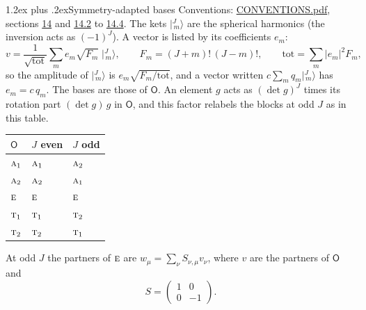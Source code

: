 \documentclass[10pt,a4paper]{article}
\makeatletter
\renewcommand\section{\@startsection{section}{1}{\z@}{-3ex plus -1ex minus -.2ex}%
  {1.2ex plus .2ex}{\normalfont\large\sffamily\bfseries\color{parttitle}}}
\numberwithin{equation}{section}
\newcommand{\grp}[1]{\mathsf{#1}}
\newcommand{\irr}[1]{\text{\normalfont\scshape #1}}
\newcommand{\intx}{\mu}
\newcommand{\jm}[2]{\bigl\lvert{}^{#1}_{\,#2}\bigr\rangle}
\makeatother
\begin{document}
\section{Symmetry-adapted bases}\label{s:bases}
Conventions: \href{../../CONVENTIONS.pdf}{CONVENTIONS.pdf}, sections \href{../../CONVENTIONS.pdf\#conv.14}{14} and \href{../../CONVENTIONS.pdf\#conv.14.2}{14.2} to \href{../../CONVENTIONS.pdf\#conv.14.4}{14.4}.
\leavevmode\label{n:index.m}\label{n:vector.ket}The kets $\jm{J}{m}$ are the spherical harmonics (the inversion acts as $(-1)^J$). \label{n:index.ketcoefficient}\label{n:vector.basis.symmetry}\label{n:index.ketweight}\label{n:index.total}A vector is listed by its coefficients $e_m$:
\begin{equation}\label{e:ket}v = \frac{1}{\sqrt{\mathrm{tot}}}\sum_m e_m\sqrt{F_m}\;\jm{J}{m},\qquad F_m = (J+m)!\,(J-m)!,\qquad \mathrm{tot} = \sum_m |e_m|^2F_m,\end{equation}
\leavevmode\label{n:index.factor.c}\label{n:index.multiplicity.copies}so the amplitude of $\jm{J}{m}$ is $e_m\sqrt{F_m/\mathrm{tot}}$, and a vector written $c\sum_m q_m\jm{J}{m}$ has $e_m = c\,q_m$.
The bases are those of \href{O.pdf}{$\grp{O}$}. An element $g$ acts as $(\det g)^J$ times its rotation part $(\det g)\,g$ in \href{O.pdf}{$\grp{O}$}, and this factor relabels the blocks at odd $J$ as in this table.
\begin{center}\begin{tabular}{@{}lll@{}}\toprule
\href{O.pdf}{$\grp{O}$} & $J$ even & $J$ odd\\\midrule
$\irr{a}_{1}$ & $\irr{a}_{1}$ & $\irr{a}_{2}$\\
$\irr{a}_{2}$ & $\irr{a}_{2}$ & $\irr{a}_{1}$\\
$\irr{e}$ & $\irr{e}$ & $\irr{e}$\\
$\irr{t}_{1}$ & $\irr{t}_{1}$ & $\irr{t}_{2}$\\
$\irr{t}_{2}$ & $\irr{t}_{2}$ & $\irr{t}_{1}$\\
\bottomrule\end{tabular}\end{center}
\leavevmode\label{n:vector.basis.derived}\label{n:matrix.intertwiner}At odd $J$ the partners of $\irr{e}$ are $w_\intx = \sum_\nu S_{\nu,\intx} v_\nu$, where $v$ are the partners of \href{O.pdf}{$\grp{O}$} and
\begin{equation}\label{e:intertwiner1}S = \begin{pmatrix}1 & 0\\0 & -1\end{pmatrix}.\end{equation}
\end{document}

